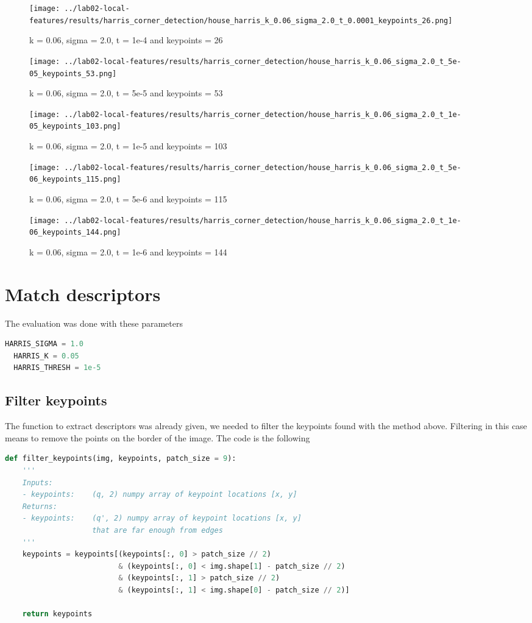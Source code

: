 \documentclass{ETHExercise}
\begin{document}
\begin{figure}
      \texttt{[image: ../lab02-local-features/results/harris\_corner\_detection/house\_harris\_k\_0.06\_sigma\_2.0\_t\_0.0001\_keypoints\_26.png]}
      \caption{k = 0.06, sigma = 2.0, t = 1e-4 and keypoints = 26}
    \endminipage\hfill
      \texttt{[image: ../lab02-local-features/results/harris\_corner\_detection/house\_harris\_k\_0.06\_sigma\_2.0\_t\_5e-05\_keypoints\_53.png]}
      \caption{k = 0.06, sigma = 2.0, t = 5e-5 and keypoints = 53}
    \endminipage\hfill
      \texttt{[image: ../lab02-local-features/results/harris\_corner\_detection/house\_harris\_k\_0.06\_sigma\_2.0\_t\_1e-05\_keypoints\_103.png]}
      \caption{k = 0.06, sigma = 2.0, t = 1e-5 and keypoints = 103}
    \endminipage\hfill
      \texttt{[image: ../lab02-local-features/results/harris\_corner\_detection/house\_harris\_k\_0.06\_sigma\_2.0\_t\_5e-06\_keypoints\_115.png]}
      \caption{k = 0.06, sigma = 2.0, t = 5e-6 and keypoints = 115}
    \endminipage\space\space\space 
      \texttt{[image: ../lab02-local-features/results/harris\_corner\_detection/house\_harris\_k\_0.06\_sigma\_2.0\_t\_1e-06\_keypoints\_144.png]}
      \caption{k = 0.06, sigma = 2.0, t = 1e-6 and keypoints = 144}
    \endminipage
  \end{figure}


\newpage
\section{Match descriptors}
The evaluation was done with these parameters
\begin{lstlisting}[language=Python, caption=parameters used to match descriptors]
  HARRIS_SIGMA = 1.0
  HARRIS_K = 0.05
  HARRIS_THRESH = 1e-5
\end{lstlisting}

\subsection{Filter keypoints}
The function to extract descriptors was already given, we needed to filter the keypoints 
found with the method above. Filtering in this case means to remove the points on the border of the image.
The code is the following
\begin{lstlisting}[language=Python, caption=filter keypoints]
  def filter_keypoints(img, keypoints, patch_size = 9):
    '''
    Inputs:
    - keypoints:    (q, 2) numpy array of keypoint locations [x, y]
    Returns:
    - keypoints:    (q', 2) numpy array of keypoint locations [x, y] 
                    that are far enough from edges
    '''
    keypoints = keypoints[(keypoints[:, 0] > patch_size // 2) 
                          & (keypoints[:, 0] < img.shape[1] - patch_size // 2) 
                          & (keypoints[:, 1] > patch_size // 2) 
                          & (keypoints[:, 1] < img.shape[0] - patch_size // 2)]
    
    return keypoints
\end{lstlisting}
\end{document}

